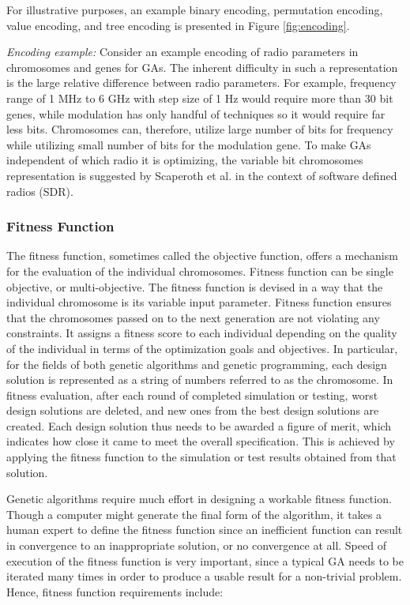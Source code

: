 \documentclass[journal]{IEEEtran}
\begin{document}
\vspace{2mm}
For illustrative purposes, an example binary encoding, permutation encoding, value encoding, and tree encoding is presented in Figure \ref{fig:encoding}.

\vspace{2mm}
\textit{Encoding example:} Consider an example encoding of radio parameters in chromosomes and genes for GAs. The inherent difficulty in such a representation is the large relative difference between radio parameters. For example, frequency range of 1 MHz to 6 GHz with step size of 1 Hz would require more than 30 bit genes, while modulation has only handful of techniques so it would require far less bits. Chromosomes can, therefore, utilize large number of bits for frequency while utilizing small number of bits for the modulation gene. To make GAs independent of which radio it is optimizing, the variable bit chromosomes representation is suggested by Scaperoth et al. \cite{scaperoth2006cognitive} in the context of  software defined radios (SDR).

\vspace{2mm}
\subsubsection{Fitness Function}

The fitness function, sometimes called the objective function, offers a mechanism for the evaluation of the individual chromosomes. Fitness function can be single objective, or multi-objective. The fitness function is devised in a way that the individual chromosome is its variable input parameter. Fitness function ensures that the chromosomes passed on to the next generation are not violating any constraints. It assigns a fitness score to each individual depending on the quality of the individual in terms of the optimization goals and objectives. In particular, for the fields of both genetic algorithms and genetic programming, each design solution is represented as a string of numbers referred to as the chromosome. In fitness evaluation, after each round of completed simulation or testing,  worst design solutions are deleted, and  new ones from the best design solutions are created. Each design solution thus needs to be awarded a figure of merit, which indicates how close it came to meet the overall specification. This is achieved by applying the fitness function to the simulation or test results obtained from that solution.

Genetic algorithms require much effort in designing a workable fitness function.  Though a computer might generate the final form of the algorithm, it takes a human expert to define the fitness function since an inefficient function can result in convergence to an inappropriate solution, or no convergence at all. Speed of execution of the fitness function is very important, since a typical GA needs to be iterated many times in order to produce a usable result for a non-trivial problem. Hence, fitness function requirements include:
\end{document}
